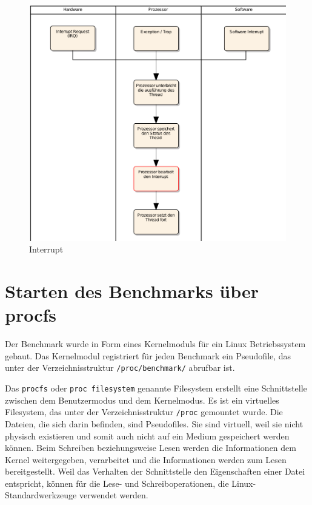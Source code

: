 \begin{figure}[H]
\centering
\includegraphics[width=1.0\textwidth]{images/interrupt_ea.pdf}
\caption{Interrupt}
\label{fig:Interrupt}
\end{figure}

\section{Starten des Benchmarks über procfs}

Der Benchmark wurde in Form eines Kernelmoduls für ein Linux Betriebssystem gebaut. Das Kernelmodul registriert für jeden Benchmark ein Pseudofile, das unter der Verzeichnisstruktur \texttt{/proc/benchmark/} abrufbar ist.
\par
Das \texttt{procfs} oder \texttt{proc filesystem} genannte Filesystem erstellt eine Schnittstelle zwischen dem Benutzermodus und dem Kernelmodus. Es ist ein virtuelles Filesystem, das unter der Verzeichnisstruktur \texttt{/proc} gemountet wurde\cite{mauerer2010professional}. Die Dateien, die sich darin befinden, sind Pseudofiles. Sie sind virtuell, weil sie nicht physisch existieren und somit auch nicht auf ein Medium gespeichert werden können. Beim Schreiben beziehungsweise Lesen werden die Informationen dem Kernel weitergegeben, verarbeitet und die Informationen werden zum Lesen bereitgestellt. Weil das Verhalten der Schnittstelle den Eigenschaften einer Datei entspricht, können für die Lese- und Schreiboperationen, die Linux-Standardwerkzeuge verwendet werden.


